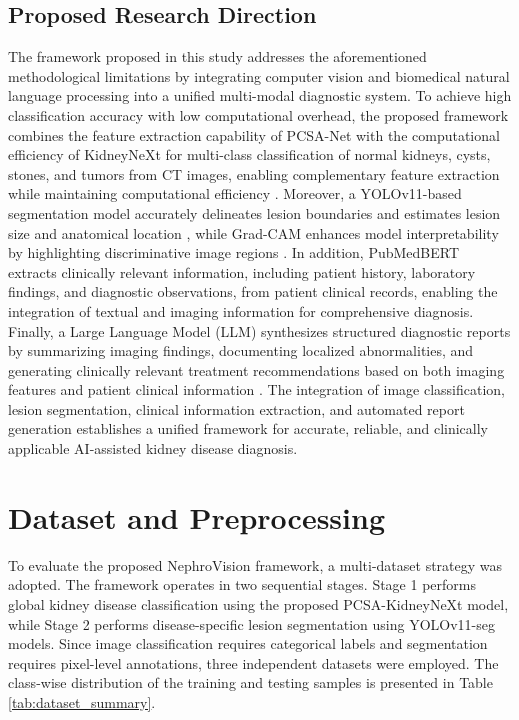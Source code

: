 \documentclass[]{elsarticle}
\begin{document}
\subsection{Proposed Research Direction} 
The framework proposed in this study addresses the aforementioned methodological limitations by integrating computer vision and biomedical natural language processing into a unified multi-modal diagnostic system. To achieve high classification accuracy with low computational overhead, the proposed framework combines the feature extraction capability of PCSA-Net with the computational efficiency of KidneyNeXt for multi-class classification of normal kidneys, cysts, stones, and tumors from CT images, enabling complementary feature extraction while maintaining computational efficiency \cite{kumar2024comprehensive, hossain2025detection}. Moreover, a YOLOv11-based segmentation model accurately delineates lesion boundaries and estimates lesion size and anatomical location \cite{dataset_roboflow_tumor, dataset_roboflow_cyst}, while Grad-CAM enhances model interpretability by highlighting discriminative image regions \cite{holzinger2019causability, selvaraju2017grad}. In addition, PubMedBERT extracts clinically relevant information, including patient history, laboratory findings, and diagnostic observations, from patient clinical records, enabling the integration of textual and imaging information for comprehensive diagnosis. Finally, a Large Language Model (LLM) synthesizes structured diagnostic reports by summarizing imaging findings, documenting localized abnormalities, and generating clinically relevant treatment recommendations based on both imaging features and patient clinical information \cite{liu2024bootstrapping, sloan2024automated}. The integration of image classification, lesion segmentation, clinical information extraction, and automated report generation establishes a unified framework for accurate, reliable, and clinically applicable AI-assisted kidney disease diagnosis.

\section{Dataset and Preprocessing}
\label{sec:dataset}

To evaluate the proposed NephroVision framework, a multi-dataset strategy was adopted. The framework operates in two sequential stages. Stage 1 performs global kidney disease classification using the proposed PCSA-KidneyNeXt model, while Stage 2 performs disease-specific lesion segmentation using YOLOv11-seg models. Since image classification requires categorical labels and segmentation requires pixel-level annotations, three independent datasets were employed. The class-wise distribution of the training and testing samples is presented in Table \ref{tab:dataset_summary}.
\end{document}
